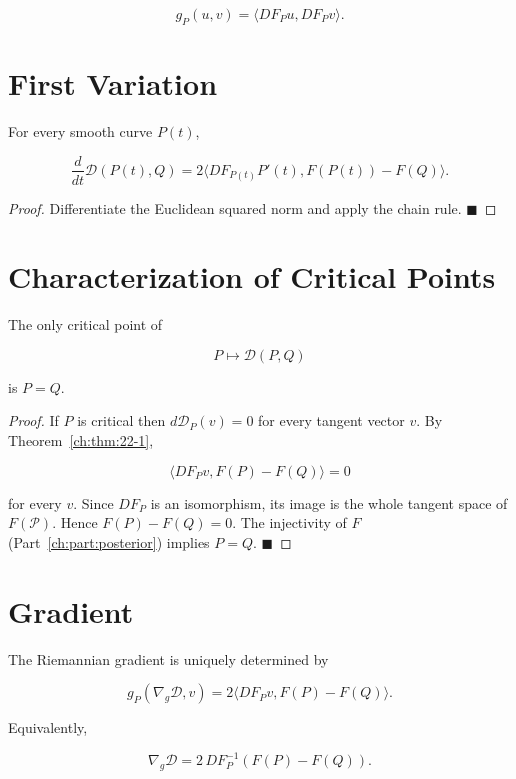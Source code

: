 \[
g_P(u,v)=\langle DF_Pu,DF_Pv\rangle.
\]

\section{First Variation}\label{ch:sec:first-variation}

\begin{theorem}
\label{ch:thm:22-1}
For every smooth curve \(P(t)\),

\[
\frac{d}{dt}\mathcal D(P(t),Q)=
2\langle DF_{P(t)}P'(t),F(P(t))-F(Q)\rangle.
\]
\end{theorem}

\begin{proof}
Differentiate the Euclidean squared norm and apply the chain rule.
$\blacksquare$
\end{proof}

\section{Characterization of Critical Points}\label{ch:sec:characterization-of-critical-points}

\begin{theorem}
\label{ch:thm:22-2}
The only critical point of

\[
P\mapsto\mathcal D(P,Q)
\]

is \(P=Q\).
\end{theorem}

\begin{proof}
If \(P\) is critical then \(d\mathcal D_P(v)=0\) for every tangent
vector \(v\). By Theorem~\ref{ch:thm:22-1},

\[
\langle DF_Pv,F(P)-F(Q)\rangle=0
\]

for every \(v\). Since \(DF_P\) is an isomorphism, its image is the
whole tangent space of \(F(\mathcal P)\). Hence \(F(P)-F(Q)=0\).
The injectivity of \(F\) (Part~\ref{ch:part:posterior}) implies \(P=Q\). $\blacksquare$
\end{proof}

\section{Gradient}\label{ch:sec:gradient}

\begin{corollary}
\label{ch:cor:22-3}
The Riemannian gradient is uniquely determined by

\[
g_P(\nabla_g\mathcal D,v)=2\langle DF_Pv,F(P)-F(Q)\rangle.
\]

Equivalently,

\[
\nabla_g\mathcal D = 2\,DF_P^{-1}(F(P)-F(Q)).
\]
\end{corollary}

